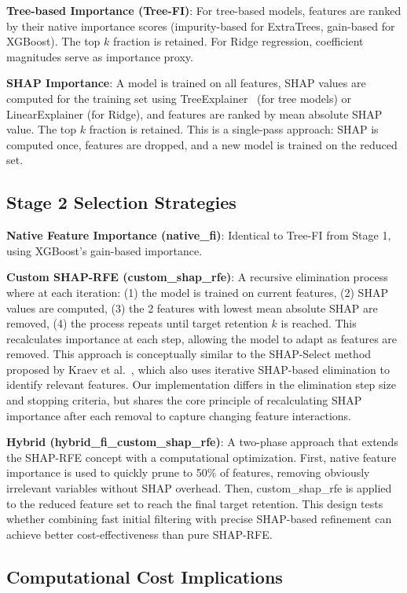 \textbf{Tree-based Importance (Tree-FI)}: For tree-based models, features are ranked by their native importance scores (impurity-based for ExtraTrees, gain-based for XGBoost). The top $k$ fraction is retained. For Ridge regression, coefficient magnitudes serve as importance proxy.

\textbf{SHAP Importance}: A model is trained on all features, SHAP values are computed for the training set using TreeExplainer~\cite{lundberg2020local} (for tree models) or LinearExplainer (for Ridge), and features are ranked by mean absolute SHAP value. The top $k$ fraction is retained. This is a single-pass approach: SHAP is computed once, features are dropped, and a new model is trained on the reduced set.

\subsection{Stage 2 Selection Strategies}

\textbf{Native Feature Importance (native\_fi)}: Identical to Tree-FI from Stage 1, using XGBoost's gain-based importance.

\textbf{Custom SHAP-RFE (custom\_shap\_rfe)}: A recursive elimination process where at each iteration: (1) the model is trained on current features, (2) SHAP values are computed, (3) the 2 features with lowest mean absolute SHAP are removed, (4) the process repeats until target retention $k$ is reached. This recalculates importance at each step, allowing the model to adapt as features are removed. This approach is conceptually similar to the SHAP-Select method proposed by Kraev et al.~\cite{kraev2024shap}, which also uses iterative SHAP-based elimination to identify relevant features. Our implementation differs in the elimination step size and stopping criteria, but shares the core principle of recalculating SHAP importance after each removal to capture changing feature interactions.

\textbf{Hybrid (hybrid\_fi\_custom\_shap\_rfe)}: A two-phase approach that extends the SHAP-RFE concept with a computational optimization. First, native feature importance is used to quickly prune to 50\% of features, removing obviously irrelevant variables without SHAP overhead. Then, custom\_shap\_rfe is applied to the reduced feature set to reach the final target retention. This design tests whether combining fast initial filtering with precise SHAP-based refinement can achieve better cost-effectiveness than pure SHAP-RFE.

\subsection{Computational Cost Implications}


